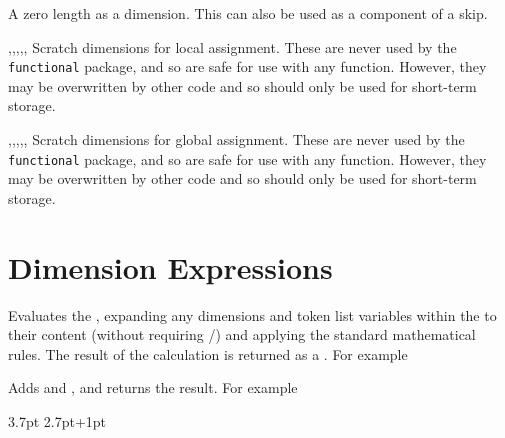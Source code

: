 \documentclass[oneside]{book}
\begin{document}
\begin{variable}{\cZeroDim}
A zero length as a dimension.  This can also be used as a component
of a skip.
\end{variable}

\begin{variable}{\lTmpaDim,\lTmpbDim,\lTmpcDim,\lTmpiDim,\lTmpjDim,\lTmpkDim}
Scratch dimensions for local assignment. These are never used by
the \verb!functional! package, and so are safe for use with any
function. However, they may be overwritten by other
code and so should only be used for short-term storage.
\end{variable}

\begin{variable}{\gTmpaDim,\gTmpbDim,\gTmpcDim,\gTmpiDim,\gTmpjDim,\gTmpkDim}
Scratch dimensions for global assignment. These are never used by
the \verb!functional! package, and so are safe for use with any
function. However, they may be overwritten by other
code and so should only be used for short-term storage.
\end{variable}

\section{Dimension Expressions}

\begin{function}{\dimEval}
\begin{syntax}
 
\end{syntax}
Evaluates the , expanding any
dimensions and token list variables within the 
to their content (without requiring /)
and applying the standard mathematical rules. The result of the
calculation is returned as a .
For example
\begin{demohigh}
\end{demohigh}
\end{function}

\begin{function}{\dimMathAdd}
\begin{syntax}
  
\end{syntax}
Adds  and ,
and returns the result. For example
\begin{demohigh}
\dimMathAdd {2.8pt} {3.7pt}
\dimMathAdd {3.8pt-1pt} {2.7pt+1pt}
\end{demohigh}
\end{function}
\end{document}
